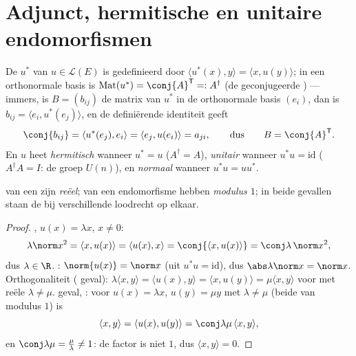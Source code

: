 \section{Adjunct, hermitische en unitaire endomorfismen}

\begin{definition}\label{def:b2:hermitian:adjoint}
De \emph{} $u^*$ van $u \in \mathcal{L}(E)$ is gedefinieerd
door $\langle u^*(x), y\rangle = \langle x, u(y)\rangle$; in een
orthonormale basis is $\operatorname{Mat}(u^*) = \conj{A}^{\mathsf
T} =: A^{\dagger}$ (de geconjugeerde ) --- immers,
is $B = (b_{ij})$ de matrix van $u^*$ in de orthonormale basis
$(e_i)$, dan is $b_{ij} = \langle e_i, u^*(e_j)\rangle$, en de
definiërende identiteit geeft
\[
\conj{b_{ij}}
= \langle u^*(e_j), e_i\rangle
= \langle e_j, u(e_i)\rangle = a_{ji} ,
\qquad\text{dus}\qquad
B = \conj{A}^{\mathsf T} .
\] En $u$ heet
\emph{hermitisch} wanneer $u^* = u$
($A^\dagger = A$), \emph{unitair} wanneer
$u^*u = \mathrm{id}$ ($A^\dagger A = I$: de groep $U(n)$), en
\emph{normaal} wanneer $u^*u = uu^*$.
\end{definition}

\begin{proposition}\label{prop:b2:hermitian:eigenvalues}
 van een  zijn \emph{reëel};
 van een  endomorfisme hebben \emph{modulus
$1$}; in beide gevallen staan de  bij verschillende
 loodrecht op elkaar.
\end{proposition}

\begin{proof}
, $u(x) = \lambda x$, $x \neq 0$:
\[
\lambda \norm x^2 = \langle x, u(x)\rangle = \langle u(x), x\rangle
= \conj{\langle x, u(x)\rangle} = \conj\lambda\,\norm x^2 ,
\]
dus $\lambda \in \R$. : $\norm{u(x)} = \norm x$ (uit $u^*u =
\mathrm{id}$), dus $\abs\lambda\norm x = \norm x$. Orthogonaliteit
( geval): $\lambda\langle x, y\rangle = \langle u(x),
y\rangle = \langle x, u(y)\rangle = \mu\langle x, y\rangle$ voor
 met reële $\lambda \neq \mu$.  geval,
: voor $u(x) = \lambda x$, $u(y) = \mu y$ met $\lambda \neq
\mu$ (beide van modulus $1$) is
\[
\langle x, y\rangle = \langle u(x), u(y)\rangle
= \conj\lambda\mu\,\langle x, y\rangle ,
\]
en $\conj\lambda\mu = \frac{\mu}{\lambda} \neq 1$: de factor is
niet $1$, dus $\langle x, y\rangle = 0$.
\end{proof}

